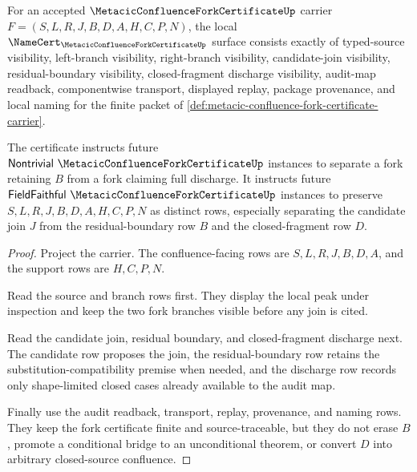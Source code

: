 \begin{theorem}
\label{thm:metacic-confluence-fork-certificate-namecert-obligations}
For an accepted $\MetacicConfluenceForkCertificateUp$ carrier $F=(S,L,R,J,B,D,A,H,C,P,N)$, the local $\NameCert_{\MetacicConfluenceForkCertificateUp}$ surface consists exactly of typed-source visibility, left-branch visibility, right-branch visibility, candidate-join visibility, residual-boundary visibility, closed-fragment discharge visibility, audit-map readback, componentwise transport, displayed replay, package provenance, and local naming for the finite packet of \autoref{def:metacic-confluence-fork-certificate-carrier}.

The certificate instructs future $\mathsf{Nontrivial}\ \MetacicConfluenceForkCertificateUp$ instances to separate a fork retaining $B$ from a fork claiming full discharge. It instructs future $\mathsf{FieldFaithful}\ \MetacicConfluenceForkCertificateUp$ instances to preserve $S,L,R,J,B,D,A,H,C,P,N$ as distinct rows, especially separating the candidate join $J$ from the residual-boundary row $B$ and the closed-fragment row $D$.
\end{theorem}
\begin{proof}
Project the carrier. The confluence-facing rows are $S,L,R,J,B,D,A$, and the support rows are $H,C,P,N$.

Read the source and branch rows first. They display the local peak under inspection and keep the two fork branches visible before any join is cited.

Read the candidate join, residual boundary, and closed-fragment discharge next. The candidate row proposes the join, the residual-boundary row retains the substitution-compatibility premise when needed, and the discharge row records only shape-limited closed cases already available to the audit map.

Finally use the audit readback, transport, replay, provenance, and naming rows. They keep the fork certificate finite and source-traceable, but they do not erase $B$, promote a conditional bridge to an unconditional theorem, or convert $D$ into arbitrary closed-source confluence.
\end{proof}


